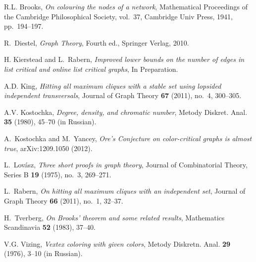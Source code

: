 \documentclass[12pt]{amsart}
\theoremstyle{plain}
\theoremstyle{definition}
\theoremstyle{remark}
\begin{document}
\begin{thebibliography}{99}

R.L. Brooks, \emph{{On colouring the nodes of a network}}, Mathematical
  Proceedings of the Cambridge Philosophical Society, vol.~37, Cambridge Univ
  Press, 1941, pp.~194--197.

R.~Diestel, \emph{{Graph Theory}}, {Fourth} ed., Springer Verlag, 2010.

H. Kierstead and L.~Rabern, \emph{{Improved lower bounds on the number of edges in list critical and online list critical graphs}}, In Preparation.

A.D. King, \emph{Hitting all maximum cliques with a stable set using lopsided
  independent transversals}, Journal of Graph Theory \textbf{67} (2011), no.~4,
  300--305.

A.V. Kostochka, \emph{{Degree, density, and chromatic number}}, Metody Diskret.
  Anal. \textbf{35} (1980), 45--70 (in Russian).
  
A.~Kostochka and M.~Yancey, \emph{{Ore's Conjecture on color-critical graphs is almost true}},
  arXiv:1209.1050 (2012).

L.~Lov\'{a}sz, \emph{Three short proofs in graph theory}, Journal of
  Combinatorial Theory, Series B \textbf{19} (1975), no.~3, 269--271.

L.~Rabern, \emph{{On hitting all maximum cliques with an independent set}},
  Journal of Graph Theory \textbf{66} (2011), no.~1, 32--37.

H.~Tverberg, \emph{{On Brooks' theorem and some related results}}, Mathematics
  Scandinavia \textbf{52} (1983), 37--40.
  
  V.G. Vizing, \emph{{Vextex coloring with given colors}}, Metody Diskretn. Anal.
    \textbf{29} (1976), 3--10 (in Russian).

\end{thebibliography}
\end{document}
